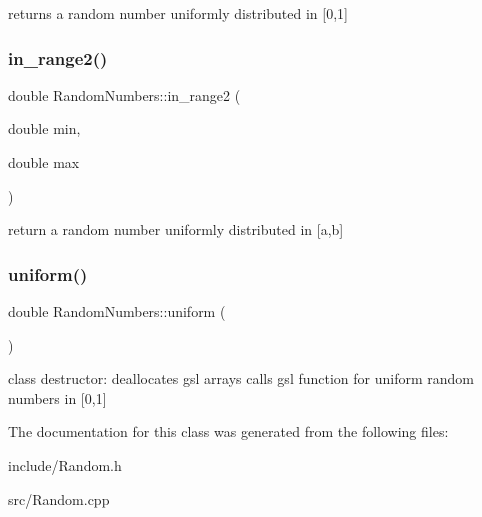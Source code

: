 returns a random number uniformly distributed in \mbox{[}0,1\mbox{]} \mbox{\label{class_random_numbers_afb570fabac6a6f9e4fb9530d8bfd0b9d}} 
\subsubsection{\texorpdfstring{in\_range2()}{in\_range2()}}
{\footnotesize\ttfamily double Random\+Numbers\+::in\+\_\+range2 (\begin{DoxyParamCaption}\item[{double}]{min,  }\item[{double}]{max }\end{DoxyParamCaption})}

return a random number uniformly distributed in \mbox{[}a,b\mbox{]} \mbox{\label{class_random_numbers_a50c452e744fa83cdc4ee7f5b03e99df4}} 
\subsubsection{\texorpdfstring{uniform()}{uniform()}}
{\footnotesize\ttfamily double Random\+Numbers\+::uniform (\begin{DoxyParamCaption}{ }\end{DoxyParamCaption})}

class destructor\+: deallocates gsl arrays calls gsl function for uniform random numbers in \mbox{[}0,1\mbox{]} 

The documentation for this class was generated from the following files\+:\begin{DoxyCompactItemize}
\item 
include/Random.\+h\item 
src/Random.\+cpp\end{DoxyCompactItemize}

